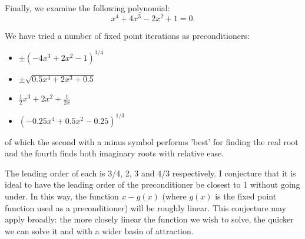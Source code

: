 \documentclass{book}
\begin{document}
Finally, we examine the following polynomial:
\begin{equation}
x^4 + 4 x^3 - 2 x^2 + 1 = 0.
\end{equation}

We have tried a number of fixed point iterations as preconditioners:
\begin{itemize}
\item $\pm (-4x^3 + 2x^2 - 1)^{1/4}$
\item $\pm \sqrt{ 0.5 x^4 + 2x^3 + 0.5 }$
\item $\frac{1}{2} x^3 + 2x^2 + \frac{1}{2x}$
\item $(-0.25 x^4 + 0.5 x^2 - 0.25)^{1/3}$
\end{itemize}
of which the second with a minus symbol performs 'best' for finding the real root and the fourth finds both imaginary roots with relative ease.

The leading order of each is 3/4, 2, 3 and 4/3 respectively.
I conjecture that it is ideal to have the leading order of the preconditioner be closest to 1 without going under.
In this way, the function $x - g(x)$ (where $g(x)$ is the fixed point function used as a preconditioner) will be roughly linear.
This conjecture may apply broadly: the more closely linear the function we wish to solve, the quicker we can solve it and with a wider basin of attraction.
\end{document}
